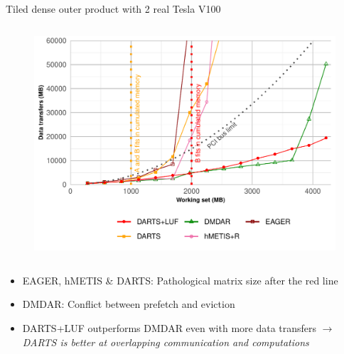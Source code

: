\documentclass{libs/ufc_format}
\begin{document}
\begin{frame}{Tiled dense outer product with 2 real Tesla V100}
\begin{columns}{}
        \begin{column}{0.5\textwidth}
	\begin{figure}
		\includegraphics[scale = 0.3]{Images/DT_dynamic_data_aware_no_hfp_gemini-2-ipdps_2GPU.pdf}
	\end{figure}
		\end{column}
		\end{columns}
	\begin{itemize}
		\item EAGER, hMETIS \& DARTS: Pathological matrix size after the red line
		\item DMDAR: Conflict between prefetch and eviction
		 \item DARTS+LUF outperforms DMDAR even with more data transfers $\rightarrow$ \emph{DARTS is better at 
		overlapping communication and computations}
	\end{itemize}
\end{frame}
\end{document}
